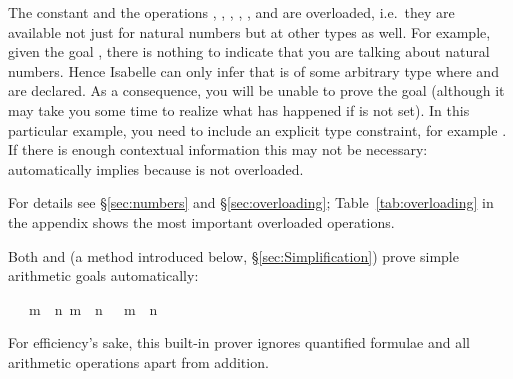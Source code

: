 \begin{isabellebody}
\begin{isamarkuptext}
\begin{warn}
  The constant  and the operations
  , ,
  , ,
  ,  and
   are overloaded, i.e.\ they are available
  not just for natural numbers but at other types as well.
  For example, given the goal ,
  there is nothing to indicate that you are talking about natural numbers.
  Hence Isabelle can only infer that  is of some arbitrary type where
   and \isa{{\isacharplus}} are declared. As a consequence, you will be unable
  to prove the goal (although it may take you some time to realize what has
  happened if  is not set).  In this particular example,
  you need to include an explicit type constraint, for example
  . If there is enough contextual information this
  may not be necessary:  automatically implies
   because  is not overloaded.

  For details see \S\ref{sec:numbers} and \S\ref{sec:overloading};
  Table~\ref{tab:overloading} in the appendix shows the most important overloaded
  operations.
\end{warn}

Both  and 
(a method introduced below, \S\ref{sec:Simplification}) prove 
simple arithmetic goals automatically:%
\end{isamarkuptext}%
\ {\isachardoublequote}{\isasymlbrakk}\ {\isasymnot}\ m\ {\isacharless}\ n{\isacharsemicolon}\ m\ {\isacharless}\ n{\isacharplus}{}\ {\isasymrbrakk}\ {\isasymLongrightarrow}\ m\ {\isacharequal}\ n{\isachardoublequote}%
\begin{isamarkuptext}%
\noindent
For efficiency's sake, this built-in prover ignores quantified formulae and all 
arithmetic operations apart from addition.


\end{isamarkuptext}
\end{isabellebody}

